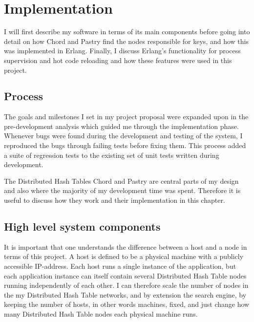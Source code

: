 

\chapter{Implementation}
I will first describe my software in terms of its main components before going into detail on how Chord and Pastry find the nodes responsible for keys, and how this was implemented in Erlang.
Finally, I discuss Erlang's functionality for process supervision and hot code reloading and how these features were used in this project.

\section{Process}
The goals and milestones I set in my project proposal were expanded upon in the pre-development analysis which guided me through the implementation phase.
Whenever bugs were found during the development and testing of the system, I reproduced the bugs through failing tests before fixing them. This process added a suite of regression tests to the existing set of unit tests written during development.

The Distributed Hash Tables Chord and Pastry are central parts of my design and also where the majority of my development time was spent. Therefore it is useful to discuss how they work and their implementation in this chapter.

\section{High level system components}
It is important that one understands the difference between a host and a node in terms of this project. A host is defined to be a physical machine with a publicly accessible IP-address. 
Each host runs a single instance of the application, but each application instance can itself contain several Distributed Hash Table nodes running independently of each other. I can therefore scale the number of nodes in the my Distributed Hash Table networks, and by extension the search engine, by keeping the number of hosts, in other words machines, fixed, and just change how many Distributed Hash Table nodes each physical machine runs.

